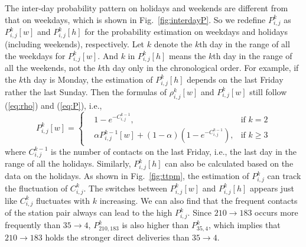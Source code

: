 The inter-day probability pattern on holidays and weekends are different
from that on weekdays, which is shown in Fig.~\ref{fig:interdayP}.
So we redefine $P^{k}_{i,j}$ as $P_{i,j}^{k}[w]$ and $P_{i,j}^{k}[h]$
for the probability estimation
on weekdays and holidays (including weekends), respectively.
Let $k$ denote the $k$th day in the range of all the weekdays
for $P_{i,j}^{k}[w]$.
And $k$ in $P_{i,j}^{k}[h]$ means the $k$th day
in the range of all the weekends,
not the $k$th day only in the chronological order.
For example, if the $k$th day is Monday,
the estimation of $P^{k}_{i,j}[h]$ depends on the last Friday
rather the last Sunday.
Then the formulas of $\rho_{i,j}^k[w]$ and $P_{i,j}^k[w]$
still follow (\ref{eq:rho}) and (\ref{eq:P}), i.e.,
\begin{equation}
\label{eq:P_weekday}
P^{k}_{i,j}[w] =
\left\{
\begin{aligned}
& 1 - e^{-C^{k-1}_{i,j}},
&\text{if  } k = 2 \\
& \alpha P^{k-1}_{i,j}[w] + (1-\alpha) (1 - e^{-C^{k-1}_{i,j}}),
&\text{if  } k \ge 3
\end{aligned}
\right.
\end{equation}
where $C^{k-1}_{i,j}$ is the number of contacts on the last Friday,
i.e., the last day in the range of all the holidays.
Similarly, $P_{i,j}^{k}[h]$ can also be calculated
based on the data on the holidays.
As shown in Fig.~\ref{fig:ttpm},
the estimation of $P_{i,j}^{k}$ can track the fluctuation of $C_{i,j}^{k}$.
The switches between $P_{i,j}^{k}[w]$ and $P_{i,j}^{k}[h]$ appears
just like $C_{i,j}^{k}$ fluctuates with $k$ increasing.
We can also find that
the frequent contacts of the station pair
always can lead to the high $P_{i,j}^{k}$.
Since $210 \rightarrow 183$ occurs more frequently than $35 \rightarrow 4$,
$P_{210,183}^{k}$ is also higher than $P_{35,4}^{k}$,
which implies that $210 \rightarrow 183$ holds
the stronger direct deliveries than $35 \rightarrow 4$.

